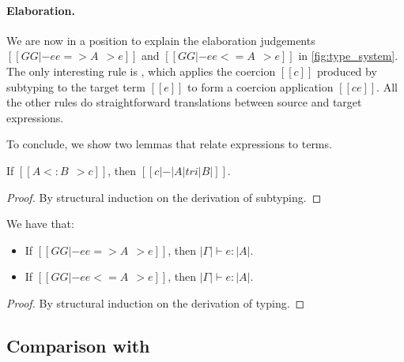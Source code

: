 \paragraph{Elaboration.}
\begin{comment}
The subtyping judgement in \cref{fig:subtype_decl} has the form $[[A <: B ~~> c]]$, which says that the subtyping
derivation of $[[A <: B]]$ produces a coercion $[[c]]$ that is used to convert a
term of type $[[ |A| ]]$ to type $[[ |B| ]]$. Each
subtyping rule has its own specific form of coercion.
\end{comment}
We are now in a position to explain the elaboration judgements $[[GG |- ee
=> A ~~> e]]$ and $[[GG |- ee <= A ~~> e]]$ in \cref{fig:type_system}. The only
interesting rule is , which applies the coercion $[[c]]$ produced by
subtyping to the target term $[[e]]$ to form a coercion application
$[[c e]]$. All the other rules do straightforward translations between
source and target expressions.


To conclude, we show two lemmas that relate \namee expressions
to \tname terms.

\begin{lemma}
  If $[[A <: B ~~> c]]$, then $[[c |-  |A| tri |B|]]$.
  \label{lemma:sub-correct}
\end{lemma}
\begin{proof}
  By structural induction on the derivation of subtyping.
\end{proof}


\begin{lemma} We have that:
  \begin{itemize}
  \item If $[[GG |- ee => A ~~> e]]$, then $|\Gamma| \vdash e : |A| $.
  \item If $[[GG |- ee <= A ~~> e]]$, then $|\Gamma| \vdash e : |A| $.
  \end{itemize}
\end{lemma}
\begin{proof}
  By structural induction on the derivation of typing.
\end{proof}

\subsection{Comparison with \oname}
\label{sec:comparision}

